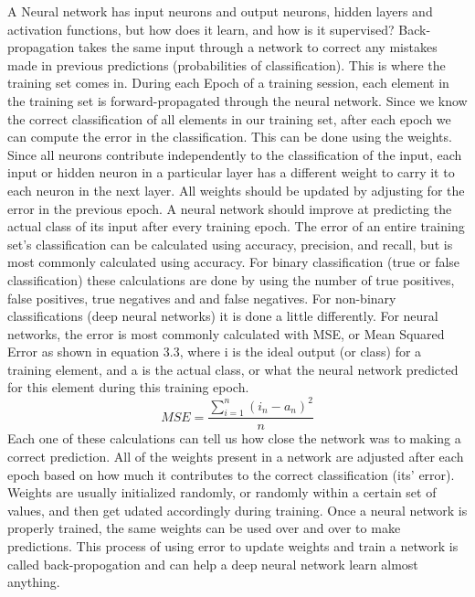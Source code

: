 \documentclass[12pt]{report} %
\begin{document}
 	A Neural network has input neurons and output neurons, hidden layers and activation functions, but how does it learn, and how is it supervised? Back-propagation takes the same input through a network to correct any mistakes made in previous predictions (probabilities of classification). This is where the training set comes in. 
	During each Epoch of a training session, each element in the training set is forward-propagated through the neural network. Since we know the correct classification of all elements in our training set, after each epoch we can compute the error in the classification. This can be done using the weights. Since all neurons contribute independently to the classification of the input, each input or hidden neuron in a particular layer has a different weight to carry it to each neuron in the next layer. All weights should be updated by adjusting for the error in the previous epoch. A neural network should improve at predicting the actual class of its input after every training epoch. 
	The error of an entire training set's classification can be calculated using accuracy, precision, and recall, but is most commonly calculated using accuracy.  For binary classification (true or false classification) these calculations are done by using the number of true positives, false positives, true negatives and and false negatives. For non-binary classifications (deep neural networks) it is done a little differently. For neural networks, the error is most commonly calculated with MSE, or Mean Squared Error as shown in equation 3.3, where i is the ideal output (or class) for a training element, and a is the actual class, or what the neural network predicted for this element during this training epoch\cite{errorHeaton}.
\begin{equation}
MSE = \frac{\sum\limits_{i=1}^n (i_{n} - a_{n})^2}{n}
\end{equation}		
	Each one of these calculations can tell us how close the network was to making a correct prediction. All of the weights present in a network are adjusted after each epoch based on how much it contributes to the correct classification (its' error). Weights are usually initialized randomly, or randomly within a certain set of values, and then get udated accordingly during training\cite{errorHeaton}. Once a neural network is properly trained, the same weights can be used over and over to make predictions. This process of using error to update weights and train a network is called back-propogation and can help a deep neural network learn almost anything.\cite{KubatMachineLearn} 
	
\end{document}
